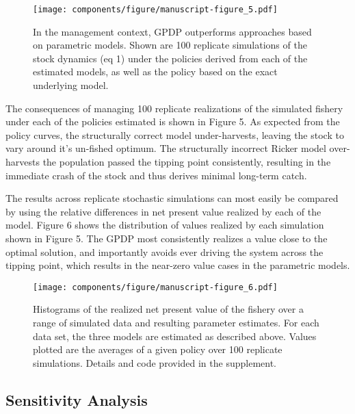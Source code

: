 \documentclass[author-year, 12pt,review]{elsarticle} %
\makeatletter
\def\maxwidth{\ifdim\Gin@nat@width>\linewidth\linewidth
\else\Gin@nat@width\fi}
\let\Oldincludegraphics\includegraphics
\renewcommand{\includegraphics}[1]{\Oldincludegraphics[width=\maxwidth]{#1}}
\makeatother
\begin{document}
\begin{figure}[htbp]
\centering
\texttt{[image: components/figure/manuscript-figure\_5.pdf]}
\caption{In the management context, GPDP outperforms approaches based on
parametric models. Shown are 100 replicate simulations of the stock
dynamics (eq 1) under the policies derived from each of the estimated
models, as well as the policy based on the exact underlying model.}
\end{figure}

The consequences of managing 100 replicate realizations of the simulated
fishery under each of the policies estimated is shown in Figure 5. As
expected from the policy curves, the structurally correct model
under-harvests, leaving the stock to vary around it's un-fished optimum.
The structurally incorrect Ricker model over-harvests the population
passed the tipping point consistently, resulting in the immediate crash
of the stock and thus derives minimal long-term catch.

The results across replicate stochastic simulations can most easily be
compared by using the relative differences in net present value realized
by each of the model. Figure 6 shows the distribution of values realized
by each simulation shown in Figure 5. The GPDP most consistently
realizes a value close to the optimal solution, and importantly avoids
ever driving the system across the tipping point, which results in the
near-zero value cases in the parametric models.

\begin{figure}[htbp]
\centering
\texttt{[image: components/figure/manuscript-figure\_6.pdf]}
\caption{Histograms of the realized net present value of the fishery
over a range of simulated data and resulting parameter estimates. For
each data set, the three models are estimated as described above. Values
plotted are the averages of a given policy over 100 replicate
simulations. Details and code provided in the supplement.}
\end{figure}

\subsection{Sensitivity Analysis}\label{sensitivity-analysis}
\end{document}
